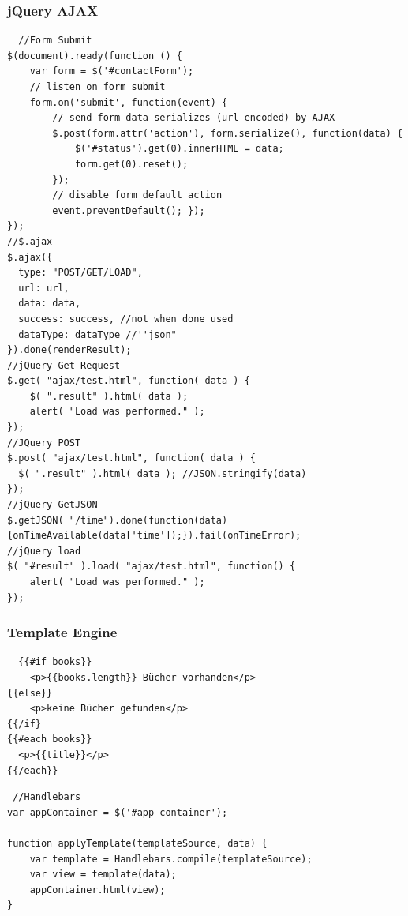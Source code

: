\begin{multicols*}{4}
 \subsubsection{jQuery AJAX}
 
\begin{verbatim}
  //Form Submit
$(document).ready(function () {
    var form = $('#contactForm');
    // listen on form submit
    form.on('submit', function(event) {
        // send form data serializes (url encoded) by AJAX
        $.post(form.attr('action'), form.serialize(), function(data) {
            $('#status').get(0).innerHTML = data;
            form.get(0).reset();
        });
        // disable form default action
        event.preventDefault(); });
});
//$.ajax
$.ajax({
  type: "POST/GET/LOAD",
  url: url,
  data: data,
  success: success, //not when done used
  dataType: dataType //''json"
}).done(renderResult);
//jQuery Get Request
$.get( "ajax/test.html", function( data ) {
    $( ".result" ).html( data );
    alert( "Load was performed." );
});
//JQuery POST
$.post( "ajax/test.html", function( data ) {
  $( ".result" ).html( data ); //JSON.stringify(data)
});
//jQuery GetJSON
$.getJSON( "/time").done(function(data)
{onTimeAvailable(data['time']);}).fail(onTimeError);
//jQuery load
$( "#result" ).load( "ajax/test.html", function() {
    alert( "Load was performed." );
});
\end{verbatim}

\subsubsection{Template Engine}
\begin{verbatim}
  {{#if books}}
	<p>{{books.length}} Bücher vorhanden</p>
{{else}}
	<p>keine Bücher gefunden</p>
{{/if}
{{#each books}}
  <p>{{title}}</p>
{{/each}}
\end{verbatim}

\begin{verbatim}
 //Handlebars
var appContainer = $('#app-container');

function applyTemplate(templateSource, data) {
	var template = Handlebars.compile(templateSource);
	var view = template(data);
	appContainer.html(view);
}


\end{verbatim}
\end{multicols*}
